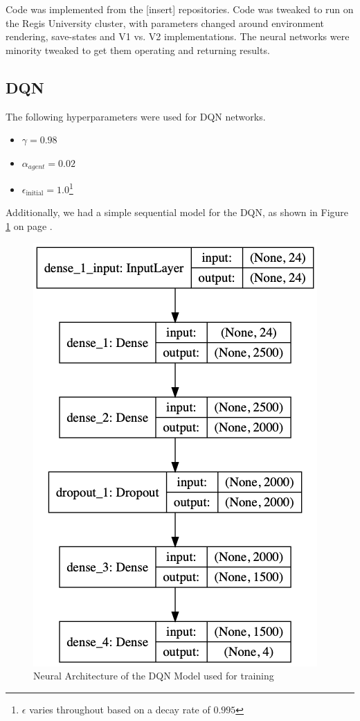 \documentclass[doc, onecolumn, 12pt]{apa6}
\begin{document}
Code was implemented from the [insert] repositories. Code was tweaked to run on the Regis University cluster, with parameters changed around environment rendering, save-states and V1 vs. V2 implementations. The neural networks were minority tweaked to get them operating and returning results. 

\subsection{DQN}
The following hyperparameters were used for DQN networks. \begin{itemize}
\item $\gamma = 0.98$
\item $\alpha_{agent} = 0.02$
\item $\epsilon_{\text{initial}} = 1.0$\footnote{$\epsilon$ varies throughout based on a decay rate of $0.995$} 
\end{itemize}

Additionally, we had a simple sequential model for the DQN, as shown in Figure \ref{DQN_Architecture} on page \pageref{DQN_Architecture}.

\begin{figure}

\includegraphics[width=\textwidth]{results/dqn/DQN_Model.png}
\caption{Neural Architecture of the DQN Model used for training}
\label{DQN_Architecture}
\end{figure}
\end{document}
